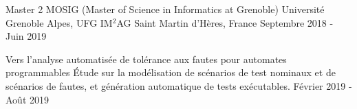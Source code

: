 


\begin{cventries}



\cventry
{Master 2 MOSIG (Master of Science in Informatics at Grenoble)} %
{Université Grenoble Alpes, UFG IM$^2$AG} %
{Saint Martin d'Hères, France} %
{Septembre 2018 - Juin 2019} %
{}

%
{}%
{}%
{}%
{
  \begin{cvdescription}
    {Vers l'analyse automatisée de tolérance aux fautes pour automates
      programmables}%
    {Étude sur la modélisation de scénarios de test nominaux et de
      scénarios de fautes, et génération automatique de tests
      exécutables.}%
    {Février 2019 - Août 2019}
  \end{cvdescription}
}



\end{cventries}